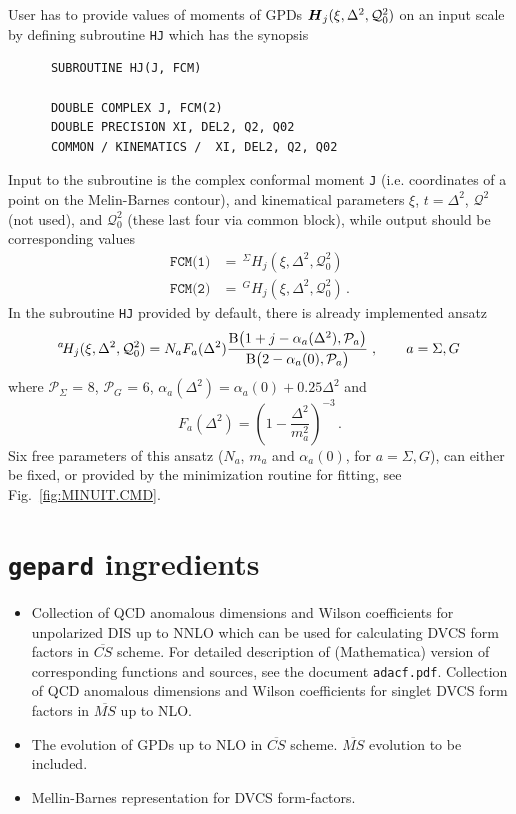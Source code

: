 \documentclass[12pt]{article}
\begin{document}
User has to provide values of moments of GPDs $\mbox{\boldmath $H$}_{j} 
(\xi,\Delta^2,\mathcal{Q}_{0}^2)$
on an input scale by defining subroutine \texttt{HJ} which has the synopsis
\begin{verbatim}
      SUBROUTINE HJ(J, FCM)

      DOUBLE COMPLEX J, FCM(2)
      DOUBLE PRECISION XI, DEL2, Q2, Q02
      COMMON / KINEMATICS /  XI, DEL2, Q2, Q02
\end{verbatim}
Input to the subroutine is the complex conformal moment \texttt{J} (i.e. coordinates of a point
on the Melin-Barnes contour), and kinematical parameters $\xi$, $t=\Delta^2$, $\mathcal{Q}^2$
(not used), and $\mathcal{Q}_{0}^2$ (these last four via common block), while output should 
be corresponding values
\begin{align}
\texttt{FCM(1)}& =\, ^{\Sigma}\!H_{j} (\xi,\Delta^2,\mathcal{Q}_{0}^2)  \\
\texttt{FCM(2)}& =\, ^{G}\!H_{j}(\xi,\Delta^2,\mathcal{Q}_{0}^2) \,.
\label{eq:FCM}
\end{align}
In the subroutine \texttt{HJ} provided by default, there is already implemented ansatz
\begin{equation}
^{a}\!H_{j}(\xi,\Delta^2,\mathcal{Q}_{0}^2) = 
N_a F_{a} (\Delta^2) \frac{ {\rm B}\big(1+j-\alpha_{a}(\Delta^2), \mathcal{P}_a\big)}{
{\rm B}\big(2-\alpha_{a}(0),\mathcal{P}_a\big)}\;, \qquad a = \Sigma, G \,
\label{eq:ansatzFIT}
\end{equation}
where $\mathcal{P}_\Sigma$ = 8,  $\mathcal{P}_G$ = 6, $\alpha_{a}(\Delta^2) =
\alpha_{a}(0) + 0.25 \Delta^2$  and 
\begin{equation}
F_{a} (\Delta^2) = \left(1 - \frac{\Delta^2}{m_{a}^2}\right)^{-3} \,.
\label{eq:F}
\end{equation}
Six free parameters of this ansatz ($N_a$, $m_a$ and $\alpha_{a}(0)$, for  $a = \Sigma, G$),
can either be fixed, or provided by the minimization routine for fitting, see
Fig.~\ref{fig:MINUIT.CMD}.


\section{\texttt{gepard} ingredients}

\begin{itemize}
\item Collection of QCD anomalous dimensions and Wilson coefficients for
unpolarized DIS up to NNLO which can be used for calculating DVCS form factors
in $\overline{CS}$ scheme. For detailed description of (Mathematica) version of
corresponding functions and sources, see the document \texttt{adacf.pdf}.
Collection of QCD anomalous dimensions and Wilson coefficients for singlet DVCS form factors
in $\overline{MS}$ up to NLO.

\item
The evolution of GPDs up to NLO in $\overline{CS}$ scheme. $\overline{MS}$
evolution to be included.

\item 
Mellin-Barnes representation for DVCS form-factors.
\end{itemize}
\end{document}
